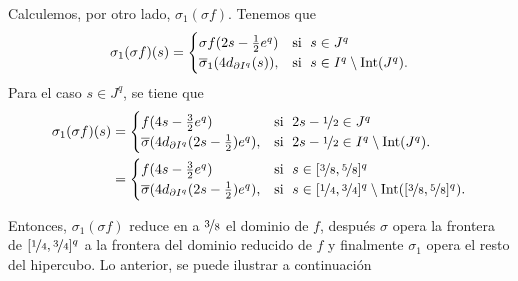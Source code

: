 \begin{dem}
\begin{center}
    \end{center}
    Calculemos, por otro lado, $\sigma_1(\sigma f)$. Tenemos que
    \begin{align*}
        \sigma_1(\sigma f)(s)=\begin{cases}
        \sigma f(2s-\frac{1}{2}e^q) & \text{si \;} s\in J^q\\
         \overline{\sigma}_1(4d_{\partial I^q}(s)), & \text{si \;} s\in I^q\setminus\mathrm{Int}(J^q).\\
         \end{cases}
    \end{align*}
    Para el caso $s\in J^q$, se tiene que
    \begin{align*}
        \sigma_1(\sigma f)(s)&=\begin{cases}
         f(4s-\frac{3}{2}e^q) & \text{si \;} 2s-\nicefrac{1}{2}\in J^q\\
         \overline{\sigma}(4d_{\partial I^q}(2s-\frac{1}{2})e^q), & \text{si \;} 2s-\nicefrac{1}{2}\in I^q\setminus\mathrm{Int}(J^q).\\
         \end{cases}\\
         &=\begin{cases}
         f(4s-\frac{3}{2}e^q) & \text{si \;} s\in [\nicefrac{3}{8},\nicefrac{5}{8}]^q\\
         \overline{\sigma}(4d_{\partial I^q}(2s-\frac{1}{2})e^q), & \text{si \;} s\in [\nicefrac{1}{4},\nicefrac{3}{4}]^q\setminus\mathrm{Int}([\nicefrac{3}{8},\nicefrac{5}{8}]^q).\\
         \end{cases}
    \end{align*}

    Entonces, $\sigma_1(\sigma f)$ reduce en a $\nicefrac{3}{8}$ el dominio de $f$, después  $\sigma$  opera la frontera de $[\nicefrac{1}{4},\nicefrac{3}{4}]^q$ a la frontera del dominio reducido de $f$ y finalmente $\sigma_1$ opera el resto del hipercubo. Lo anterior, se puede ilustrar a continuación
    \begin{center}
\end{center}
\end{dem}
